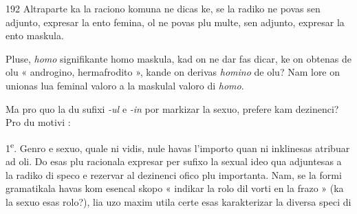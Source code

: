 \begin{VUpage}[196]{192}
Altraparte ka la raciono komuna ne dicas ke, se la radiko\nl
ne povas sen adjunto, expresar la ento femina, ol ne povas\nl
plu multe, sen adjunto, expresar la ento maskula.

Pluse, \textit{homo} signifikante homo maskula, kad on ne dar\cc
fas dicar, ke on obtenas de olu « androgino, hermafrodito »,\nl
kande on derivas \textit{homino} de olu? Nam lore on unionas lua\nl
feminal valoro a la maskulal valoro di \textit{homo}.

Ma pro quo la du sufixi \textit{-ul} e \textit{-in} por markizar la sexuo,\nl
prefere kam dezinenci? Pro du motivi :

1\textsuperscript{e}. Genro e sexuo, quale ni vidis, nule havas l'importo\nl
quan ni inklinesas atribuar ad oli. Do esas plu racionala\nl
expresar per sufixo la sexual ideo qua adjuntesas a la radiko\nl
di speco e rezervar al dezinenci ofico plu importanta. Nam,\nl
se la formi gramatikala havas kom esencal skopo « indikar\nl
la rolo dil vorti en la frazo » (ka la sexuo esas rolo?), lia\nl
uzo maxim utila certe esas karakterizar la diversa speci di\parplein
\end{VUpage}

